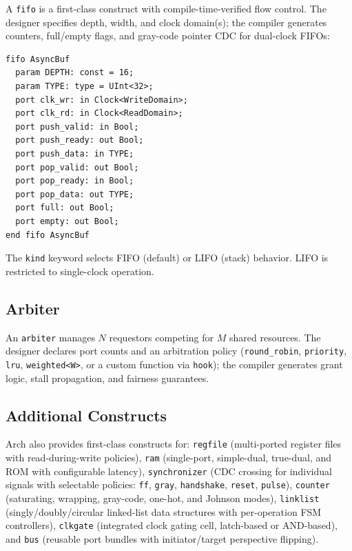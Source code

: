\documentclass[11pt,twocolumn]{article}
\begin{document}
A \texttt{fifo} is a first-class construct with compile-time-verified flow control. The designer specifies depth, width, and clock domain(s); the compiler generates counters, full/empty flags, and gray-code pointer CDC for dual-clock FIFOs:

\begin{lstlisting}[language=Arch,caption={Dual-clock FIFO},label={lst:fifo}]
fifo AsyncBuf
  param DEPTH: const = 16;
  param TYPE: type = UInt<32>;
  port clk_wr: in Clock<WriteDomain>;
  port clk_rd: in Clock<ReadDomain>;
  port push_valid: in Bool;
  port push_ready: out Bool;
  port push_data: in TYPE;
  port pop_valid: out Bool;
  port pop_ready: in Bool;
  port pop_data: out TYPE;
  port full: out Bool;
  port empty: out Bool;
end fifo AsyncBuf
\end{lstlisting}

The \texttt{kind} keyword selects FIFO (default) or LIFO (stack) behavior. LIFO is restricted to single-clock operation.

\subsection{Arbiter}

An \texttt{arbiter} manages $N$ requestors competing for $M$ shared resources. The designer declares port counts and an arbitration policy (\texttt{round\_robin}, \texttt{priority}, \texttt{lru}, \texttt{weighted<W>}, or a custom function via \texttt{hook}); the compiler generates grant logic, stall propagation, and fairness guarantees.

\subsection{Additional Constructs}

Arch also provides first-class constructs for:
\texttt{regfile} (multi-ported register files with read-during-write policies),
\texttt{ram} (single-port, simple-dual, true-dual, and ROM with configurable latency),
\texttt{synchronizer} (CDC crossing for individual signals with selectable policies: \texttt{ff}, \texttt{gray}, \texttt{handshake}, \texttt{reset}, \texttt{pulse}),
\texttt{counter} (saturating, wrapping, gray-code, one-hot, and Johnson modes),
\texttt{linklist} (singly/doubly/circular linked-list data structures with per-operation FSM controllers),
\texttt{clkgate} (integrated clock gating cell, latch-based or AND-based), and
\texttt{bus} (reusable port bundles with initiator/target perspective flipping).
\end{document}
